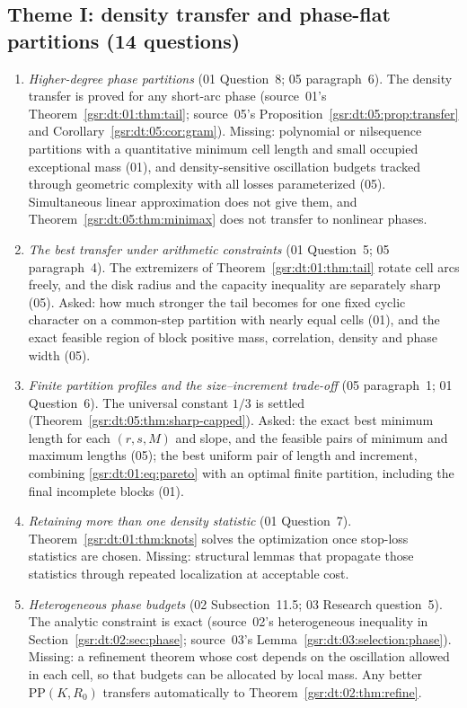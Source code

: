 \documentclass[11pt,letterpaper]{article}
\numberwithin{equation}{section}
\theoremstyle{definition}
\theoremstyle{remark}
\newcommand{\1}{\mathbf 1}
\begin{document}
\subsection*{Theme I: density transfer and phase-flat partitions (14 questions)}
\begin{enumerate}[label=\textbf{I.\arabic*},ref=I.\arabic*,leftmargin=2.6em]
\item\label{gsr:fz:q:I:higher} \emph{Higher-degree phase partitions} (01 Question~8; 05 paragraph~6). The density transfer is proved for any short-arc phase (source~01's Theorem~\ref{gsr:dt:01:thm:tail}; source~05's Proposition~\ref{gsr:dt:05:prop:transfer} and Corollary~\ref{gsr:dt:05:cor:gram}). Missing: polynomial or nilsequence partitions with a quantitative minimum cell length and small occupied exceptional mass (01), and density-sensitive oscillation budgets tracked through geometric complexity with all losses parameterized (05). Simultaneous linear approximation does not give them, and Theorem~\ref{gsr:dt:05:thm:minimax} does not transfer to nonlinear phases.
\item\label{gsr:fz:q:I:arith} \emph{The best transfer under arithmetic constraints} (01 Question~5; 05 paragraph~4). The extremizers of Theorem~\ref{gsr:dt:01:thm:tail} rotate cell arcs freely, and the disk radius and the capacity inequality are separately sharp (05). Asked: how much stronger the tail becomes for one fixed cyclic character on a common-step partition with nearly equal cells (01), and the exact feasible region of block positive mass, correlation, density and phase width (05).
\item\label{gsr:fz:q:I:profile} \emph{Finite partition profiles and the size--increment trade-off} (05 paragraph~1; 01 Question~6). The universal constant $1/3$ is settled (Theorem~\ref{gsr:dt:05:thm:sharp-capped}). Asked: the exact best minimum length for each $(r,s,M)$ and slope, and the feasible pairs of minimum and maximum lengths (05); the best uniform pair of length and increment, combining \eqref{gsr:dt:01:eq:pareto} with an optimal finite partition, including the final incomplete blocks (01).
\item\label{gsr:fz:q:I:moments} \emph{Retaining more than one density statistic} (01 Question~7). Theorem~\ref{gsr:dt:01:thm:knots} solves the optimization once stop-loss statistics are chosen. Missing: structural lemmas that propagate those statistics through repeated localization at acceptable cost.
\item\label{gsr:fz:q:I:budget} \emph{Heterogeneous phase budgets} (02 Subsection~11.5; 03 Research question~5). The analytic constraint is exact (source~02's heterogeneous inequality in Section~\ref{gsr:dt:02:sec:phase}; source~03's Lemma~\ref{gsr:dt:03:selection:phase}). Missing: a refinement theorem whose cost depends on the oscillation allowed in each cell, so that budgets can be allocated by local mass. Any better $\mathrm{PP}(K,R_0)$ transfers automatically to Theorem~\ref{gsr:dt:02:thm:refine}.

\end{enumerate}
\end{document}

